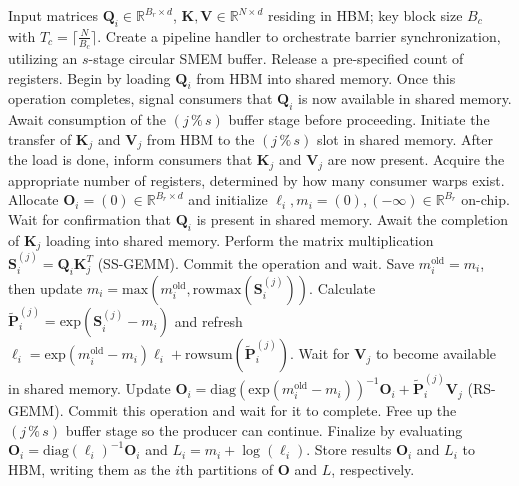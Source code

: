 \begin{algorithm}[H]
    \caption{\small\label{alg:flash3_wgmma_ws_only}\textsc{FlashAttention-3} forward pass \textbf{with no} intra-consumer overlap -- CTA perspective}
    \begin{algorithmic}[1]
\REQUIRE Input matrices $\mathbf{Q}_i \in \mathbb{R}^{B_r \times d}$, $\mathbf{K}, \mathbf{V} \in \mathbb{R}^{N \times d}$ residing in HBM; key block size $B_c$ with $T_c = \lceil \frac{N}{B_c} \rceil$.
\STATE Create a pipeline handler to orchestrate barrier synchronization, utilizing an $s$-stage circular SMEM buffer.
\STATE Release a pre-specified count of registers.
\STATE Begin by loading $\mathbf{Q}_i$ from HBM into shared memory.
\STATE Once this operation completes, signal consumers that $\mathbf{Q}_i$ is now available in shared memory.
    \STATE Await consumption of the $(j\,\%\,s)$ buffer stage before proceeding.
    \STATE Initiate the transfer of $\mathbf{K}_j$ and $\mathbf{V}_j$ from HBM to the $(j\,\%\,s)$ slot in shared memory.
    \STATE After the load is done, inform consumers that $\mathbf{K}_j$ and $\mathbf{V}_j$ are now present.
\ENDFOR
\ELSE \STATE Acquire the appropriate number of registers, determined by how many consumer warps exist.
\STATE Allocate $\mathbf{O}_i = (0) \in \mathbb{R}^{B_r \times d}$ and initialize $\ell_i, m_i = (0), (-\infty) \in \mathbb{R}^{B_r}$ on-chip.
\STATE Wait for confirmation that $\mathbf{Q}_i$ is present in shared memory.
\STATE Await the completion of $\mathbf{K}_j$ loading into shared memory.
\STATE Perform the matrix multiplication $\mathbf{S}_i^{(j)} = \mathbf{Q}_i \mathbf{K}_j^T$ (SS-GEMM). Commit the operation and wait. \label{alg:ws_only_gemm1}
\STATE Save $m_i^{\mathrm{old}} = m_i$, then update $m_i = \mathrm{max}(m_i^{\mathrm{old}}, \mathrm{rowmax}(\mathbf{S}_i^{(j)}))$. \label{code-ws:softmax_start}
\STATE Calculate $\widetilde{\mathbf{P}}_i^{(j)} = \mathrm{exp}(\mathbf{S}_i^{(j)} - m_i)$ and refresh $\ell_i = \mathrm{exp}(m_i^{\mathrm{old}} - m_i) \ell_i + \mathrm{rowsum}(\widetilde{\mathbf{P}}_i^{(j)})$. \label{code-ws:softmax_end}
\STATE Wait for $\mathbf{V}_j$ to become available in shared memory.
\STATE Update $\mathbf{O}_i = \mathrm{diag}(\mathrm{exp}(m_i^{\mathrm{old}} - m_i))^{-1} \mathbf{O}_i + \widetilde{\mathbf{P}}_i^{(j)} \mathbf{V}_j$ (RS-GEMM). Commit this operation and wait for it to complete. \label{alg:ws_only_gemm2}
\STATE Free up the $(j\,\%\,s)$ buffer stage so the producer can continue.
\ENDFOR
\STATE Finalize by evaluating $\mathbf{O}_i = \mathrm{diag}(\ell_i)^{-1} \mathbf{O}_i$ and $L_i = m_i + \log(\ell_i)$.
\STATE Store results $\mathbf{O}_i$ and $L_i$ to HBM, writing them as the $i$th partitions of $\mathbf{O}$ and $L$, respectively.
\ENDIF
\end{algorithmic}
\end{algorithm}

